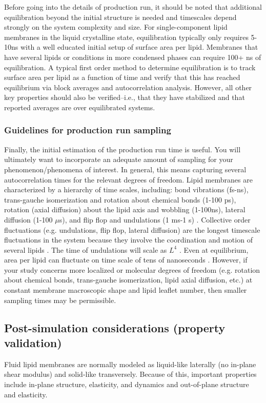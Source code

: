 \documentclass[9pt,bestpractices]{livecoms}
\begin{document}
Before going into the details of production run, it should be noted that additional equilibration beyond the initial structure is needed and timescales depend strongly on the system complexity and size. For single-component lipid membranes in the liquid crystalline state, equilibration typically only requires 5-10ns with a well educated initial setup of surface area per lipid. Membranes that have several lipids or conditions in more condensed phases can require 100+ ns of equilibration. A typical first order method to determine equilibration is to track surface area per lipid as a function of time and verify that this has reached equilibrium via block averages and autocorrelation analysis. However, all other key properties should also be verified--i.e., that they have stabilized and that reported averages are over equilibrated systems.

\subsubsection{Guidelines for production run sampling}
\label{subsubsec:prodrun}
Finally, the initial estimation of the production run time is useful.
You will ultimately want to incorporate an adequate amount of sampling for your phenomenon/phenomena of interest.
In general, this means capturing several autocorrelation times for the relevant degrees of freedom.
Lipid membranes are characterized by a hierarchy of time scales, including: bond vibrations (fs-ns), trans-gauche isomerization and rotation about chemical bonds (1-100 ps), rotation (axial diffusion) about the lipid axis and wobbling (1-100ns), lateral diffusion (1-100 $\mu$s), and flip flop and undulations (1 ms-1 s) \cite{Vermeer2007,Konig1996,Leftin2011}.
Collective order fluctuations (e.g. undulations, flip flop, lateral diffusion) are the longest timescale fluctuations in the system because they involve the coordination and motion of several lipids \cite{Vermeer2007}.
The time of undulations will scale as $L^4$ \cite{Watson2010a}.
Even at equilibrium, area per lipid can fluctuate on time scale of tens of nanoseconds \cite{Poger2016,Venable2015}.
However, if your study concerns more localized or molecular degrees of freedom (e.g. rotation about chemical bonds, trans-gauche isomerization, lipid axial diffusion, etc.) at constant membrane macroscopic shape and lipid leaflet number, then smaller sampling times may be permissible.

\subsection{Post-simulation considerations (property validation)}
\label{subsec:postsim3}
Fluid lipid membranes are normally modeled as liquid-like laterally (no in-plane shear modulus) and solid-like transversely.
Because of this, important properties include in-plane structure, elasticity, and dynamics and out-of-plane structure and elasticity.
\end{document}
